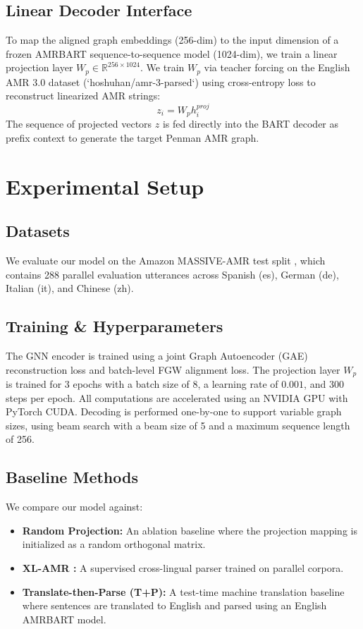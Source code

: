 \documentclass[11pt,a4paper,twocolumn]{article}
\begin{document}
\subsection{Linear Decoder Interface}
To map the aligned graph embeddings (256-dim) to the input dimension of a frozen AMRBART sequence-to-sequence model \cite{bai-etal-2022-graph} (1024-dim), we train a linear projection layer $W_p \in \mathbb{R}^{256 \times 1024}$. 
We train $W_p$ via teacher forcing on the English AMR 3.0 dataset (`hoshuhan/amr-3-parsed`) using cross-entropy loss to reconstruct linearized AMR strings:
\begin{equation}
z_i = W_p h_i^{proj}
\end{equation}
The sequence of projected vectors $z$ is fed directly into the BART decoder as prefix context to generate the target Penman AMR graph.

\section{Experimental Setup}
\subsection{Datasets}
We evaluate our model on the Amazon MASSIVE-AMR test split \cite{fitzgerald-etal-2022-massive}, which contains 288 parallel evaluation utterances across Spanish (es), German (de), Italian (it), and Chinese (zh). 

\subsection{Training \& Hyperparameters}
The GNN encoder is trained using a joint Graph Autoencoder (GAE) reconstruction loss and batch-level FGW alignment loss. The projection layer $W_p$ is trained for 3 epochs with a batch size of 8, a learning rate of $0.001$, and 300 steps per epoch. All computations are accelerated using an NVIDIA GPU with PyTorch CUDA. Decoding is performed one-by-one to support variable graph sizes, using beam search with a beam size of 5 and a maximum sequence length of 256.

\subsection{Baseline Methods}
We compare our model against:
\begin{itemize}
\item \textbf{Random Projection:} An ablation baseline where the projection mapping is initialized as a random orthogonal matrix.
\item \textbf{XL-AMR \cite{blloshmi-etal-2020-xl}:} A supervised cross-lingual parser trained on parallel corpora.
\item \textbf{Translate-then-Parse (T+P):} A test-time machine translation baseline where sentences are translated to English and parsed using an English AMRBART model.
\end{itemize}
\end{document}

